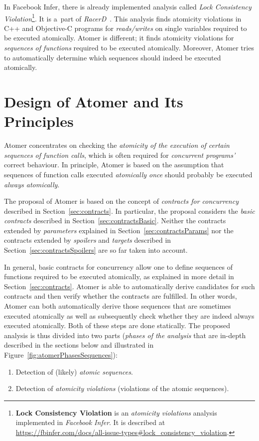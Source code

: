 In Facebook Infer, there is already implemented analysis called \emph{Lock Consistency Violation}\footnote{\textbf{Lock Consistency Violation} is an \emph{atomicity violations} analysis implemented in \emph{Facebook Infer}. It is described at \url{https://fbinfer.com/docs/all-issue-types\#lock_consistency_violation}.}. It is a~part of \emph{RacerD}~\cite{racerD, racerDOnline, staticRaceDetectorTruePositives}. This analysis finds atomicity violations in C++ and Objective-C programs for \emph{reads/writes} on single variables required to be executed atomically. Atomer is different; it finds atomicity violations for \emph{sequences of functions} required to be executed atomically. Moreover, Atomer tries to automatically determine which sequences should indeed be executed atomically.


\section{Design of Atomer and Its Principles}
\label{sec:atomerDesing}

Atomer concentrates on checking the \emph{atomicity of the execution of certain sequences of function calls}, which is often required for \emph{concurrent programs'} correct behaviour. In principle, Atomer is based on the assumption that sequences of function calls executed \emph{atomically once} should probably be executed \emph{always atomically}.

The proposal of Atomer is based on the concept of \emph{contracts for concurrency} described in Section~\ref{sec:contracts}. In particular, the proposal considers the \emph{basic contracts} described in Section~\ref{sec:contractsBasic}. Neither the contracts extended by \emph{parameters} explained in Section~\ref{sec:contractsParams} nor the contracts extended by \emph{spoilers} and \emph{targets} described in Section~\ref{sec:contractsSpoilers} are so far taken into account.

In general, basic contracts for concurrency allow one to define sequences of functions required to be executed atomically, as explained in more detail in Section~\ref{sec:contracts}. Atomer is able to automatically derive candidates for such contracts and then verify whether the contracts are fulfilled. In other words, Atomer can both automatically derive those sequences that are sometimes executed atomically as well as subsequently check whether they are indeed always executed atomically. Both of these steps are done statically. The proposed analysis is thus divided into two parts (\emph{phases of the analysis} that are in-depth described in the sections below and illustrated in Figure~\ref{fig:atomerPhasesSequences}):
\begin{enumerate}[label={\textbf{Phase~\arabic*}:}, leftmargin=6.5em]
    \item Detection of (likely) \emph{atomic sequences}.

    \item Detection of \emph{atomicity violations} (violations of the atomic sequences).
\end{enumerate}

